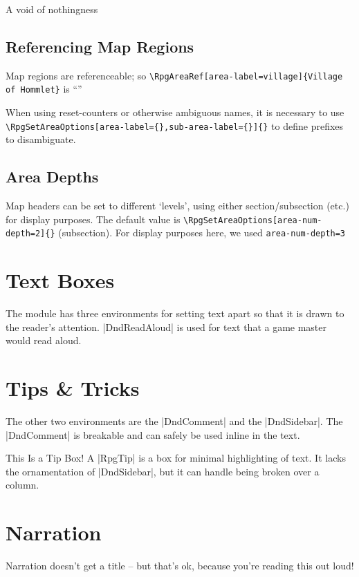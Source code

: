 				A void of nothingness

			\subsection{Referencing Map Regions}

				Map regions are referenceable; so \verb|| is ``\RpgAreaRef[area-label=village]{Village of Hommlet}''

				When using reset-counters or otherwise ambiguous names, it is necessary to use \verb|\RpgSetAreaOptions[area-label={},sub-area-label={}]{}| to define prefixes to disambiguate.

			\subsection{Area Depths}

				Map headers can be set to different `levels', using either section/subsection (etc.) for display purposes. The default value is \verb|\RpgSetAreaOptions[area-num-depth=2]{}| (subsection). For display purposes here, we used \verb|area-num-depth=3|

	\section{Text Boxes}

	The module has three environments for setting text apart so that it is drawn to the reader's attention. |DndReadAloud| is used for text that a game master would read aloud.
	\section{Tips \& Tricks}
	The other two environments are the |DndComment| and the |DndSidebar|. The |DndComment| is breakable and can safely be used inline in the text.

	\begin{RpgTip}{This Is a Tip Box!}
	A |RpgTip| is a box for minimal highlighting of text. It lacks the ornamentation of |DndSidebar|, but it can handle being broken over a column.
	\end{RpgTip}



	\section{Narration}

	\begin{RpgNarration}
		Narration doesn't get a title -- but that's ok, because you're reading this out loud!
	\end{RpgNarration}
